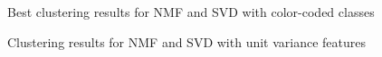 \documentclass{article}
\begin{document}
\begin{figure}[!ht]%
	\centering
		\qquad
		\vspace*{-3mm}
	\caption{Best clustering results for NMF and SVD with color-coded classes}
	\label{fig:nmf_svd1}
\end{figure}


\begin{figure}[!ht]%
	\centering
		\qquad
		\vspace*{-3mm}
	\caption{Clustering results for NMF and SVD with unit variance features}
	\label{fig:nmf_svd2}
\end{figure}
\newpage
\end{document}
